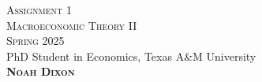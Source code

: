 \documentclass[17pt]{extarticle}  %
\begin{document}
\begin{titlepage}
    \centering
    \vspace*{\fill}

    \textsc{\Huge Assignment 1}\\[0.2em]

	\textsc{\Large Macroeconomic Theory II\\[0.5em] Spring 2025}\\[1.5em]
	
    {\Large PhD Student in Economics, Texas A\&M University}\\[3em]

	\textbf{\textsc{\LARGE {\color{darkred}Noah Dixon} }}
	
	\vspace*{\fill}

\end{titlepage}

\newpage
\UseRawInputEncoding

\newcommand{\capitalizeTitle}[1]{%
    \StrSubstitute{#1}{ }{~}[\title]%
    \expandafter\capitalizetitle\expandafter{\title}%
}
\end{document}

